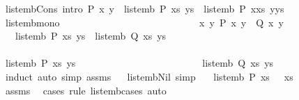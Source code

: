 \begin{isabellebody}
{\isacharbar}\ list{\isacharunderscore}emb{\isacharunderscore}Cons{}\ {\isacharbrackleft}intro{\isacharbrackright}{\isacharcolon}\ {\isachardoublequoteopen}P\ x\ y\ {\isasymLongrightarrow}\ list{\isacharunderscore}emb\ P\ xs\ ys\ {\isasymLongrightarrow}\ list{\isacharunderscore}emb\ P\ {\isacharparenleft}x{\isacharhash}xs{\isacharparenright}\ {\isacharparenleft}y{\isacharhash}ys{\isacharparenright}{\isachardoublequoteclose}\isanewline
\isanewline
{}\isamarkupfalse%
\ list{\isacharunderscore}emb{\isacharunderscore}mono{\isacharcolon}\ \ \ \ \ \ \ \ \ \ \ \ \ \ \ \ \ \ \ \ \ \ \ \ \ \isanewline
\ \ \ {\isachardoublequoteopen}{\isasymAnd}x\ y{\isachardot}\ P\ x\ y\ {\isasymlongrightarrow}\ Q\ x\ y{\isachardoublequoteclose}\isanewline
\ \ \ {\isachardoublequoteopen}list{\isacharunderscore}emb\ P\ xs\ ys\ {\isasymlongrightarrow}\ list{\isacharunderscore}emb\ Q\ xs\ ys{\isachardoublequoteclose}\isanewline
%
\isadelimproof
%
\endisadelimproof
%
\isatagproof
{}\isamarkupfalse%
\ \ \ \ \ \ \ \ \ \ \ \ \ \ \ \ \ \ \ \ \ \ \ \ \ \ \ \ \ \ \ \ \ \ \ \ \ \ \ \ \isanewline
\ \ \isamarkupfalse%
\ {\isachardoublequoteopen}list{\isacharunderscore}emb\ P\ xs\ ys{\isachardoublequoteclose}\ \ \ \ \ \ \ \ \ \ \ \ \ \ \ \ \ \ \ \ \isanewline
\ \ \isamarkupfalse%
\ \isamarkupfalse%
\ {\isachardoublequoteopen}list{\isacharunderscore}emb\ Q\ xs\ ys{\isachardoublequoteclose}\ \isamarkupfalse%
\ {\isacharparenleft}induct{\isacharparenright}\ {\isacharparenleft}auto\ simp{\isacharcolon}\ assms{\isacharparenright}\isanewline
{}\isamarkupfalse%
%
\endisatagproof
{\isafoldproof}%
%
\isadelimproof
\ \isanewline
%
\endisadelimproof
\isanewline
{}\isamarkupfalse%
\ list{\isacharunderscore}emb{\isacharunderscore}Nil{}\ {\isacharbrackleft}simp{\isacharbrackright}{\isacharcolon}\isanewline
\ \ \ {\isachardoublequoteopen}list{\isacharunderscore}emb\ P\ xs\ {\isacharbrackleft}{\isacharbrackright}{\isachardoublequoteclose}\ \ {\isachardoublequoteopen}xs\ {\isacharequal}\ {\isacharbrackleft}{\isacharbrackright}{\isachardoublequoteclose}\isanewline
%
\isadelimproof
\ \ %
\endisadelimproof
%
\isatagproof
{}\isamarkupfalse%
\ assms\ \isamarkupfalse%
\ {\isacharparenleft}cases\ rule{\isacharcolon}\ list{\isacharunderscore}emb{\isachardot}cases{\isacharparenright}\ auto%
\endisatagproof
{\isafoldproof}%
%
\isadelimproof
\isanewline
%
\endisadelimproof

\end{isabellebody}
